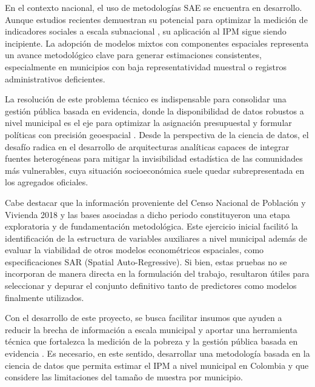 En el contexto nacional, el uso de metodologías SAE se encuentra en desarrollo. Aunque estudios recientes demuestran su potencial para optimizar la medición de indicadores sociales a escala subnacional \cite{DANE_PobrezaMultidimensional_2023, LopezSanchezPerez_2021}, su aplicación al IPM sigue siendo incipiente. La adopción de modelos mixtos con componentes espaciales representa un avance metodológico clave para generar estimaciones consistentes, especialmente en municipios con baja representatividad muestral o registros administrativos deficientes.

La resolución de este problema técnico es indispensable para consolidar una gestión pública basada en evidencia, donde la disponibilidad de datos robustos a nivel municipal es el eje para optimizar la asignación presupuestal y formular políticas con precisión geoespacial \cite{PNUD_HDR_2022}. Desde la perspectiva de la ciencia de datos, el desafío radica en el desarrollo de arquitecturas analíticas capaces de integrar fuentes heterogéneas para mitigar la invisibilidad estadística de las comunidades más vulnerables, cuya situación socioeconómica suele quedar subrepresentada en los agregados oficiales.

Cabe destacar que la información proveniente del Censo Nacional de Población y Vivienda 2018 y las bases asociadas a dicho periodo constituyeron una etapa exploratoria y de fundamentación metodológica. Este ejercicio inicial facilitó la identificación de la estructura de variables auxiliares a nivel municipal además de evaluar la viabilidad de otros modelos econométricos espaciales, como especificaciones SAR (Spatial Auto-Regressive). Si bien, estas pruebas no se incorporan de manera directa en la formulación del trabajo, resultaron útiles para seleccionar y depurar el conjunto definitivo tanto de predictores como modelos finalmente utilizados.

Con el desarrollo de este proyecto, se busca facilitar insumos que ayuden a reducir la brecha de información a escala municipal y aportar una herramienta técnica que fortalezca la medición de la pobreza y la gestión pública basada en evidencia \cite{MolinaRao_2010, PratesiSalvati_2019, RaoMolina_2015}. Es necesario, en este sentido, desarrollar una metodología basada en la ciencia de datos que permita estimar el IPM a nivel municipal en Colombia y que considere las limitaciones del tamaño de muestra por municipio.

